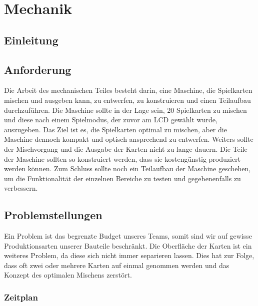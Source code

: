 \chapter{Mechanik}
\section{Einleitung}

\section{Anforderung}
\label{sec:Anforderung}
Die Arbeit des mechanischen Teiles besteht darin, eine Maschine,
die Spielkarten mischen und ausgeben kann, zu entwerfen, zu konstruieren
und einen Teilaufbau durchzuführen. Die Maschine sollte in der Lage
sein, 20 Spielkarten zu mischen und diese nach einem Spielmodus, der
zuvor am LCD gewählt wurde, auszugeben. Das Ziel ist es, die Spielkarten
optimal zu mischen, aber die Maschine dennoch kompakt und optisch
ansprechend zu entwerfen. Weiters sollte der Mischvorgang und die
Ausgabe der Karten nicht zu lange dauern. Die Teile der Maschine
sollten so konstruiert werden, dass sie kostengünstig produziert
werden können. Zum Schluss sollte noch ein Teilaufbau der Maschine
geschehen, um die Funktionalität der einzelnen Bereiche zu testen
und gegebenenfalls zu verbessern.

\section{Problemstellungen}
Ein Problem ist das begrenzte Budget unseres Teams, somit sind
wir auf gewisse Produktionsarten unserer Bauteile beschränkt.
Die Oberfläche der Karten ist ein
weiteres Problem, da diese sich nicht immer separieren lassen. Dies
hat zur Folge, dass oft zwei oder mehrere Karten auf einmal genommen
werden und das Konzept des optimalen Mischens zerstört.

\newpage
\subsection{Zeitplan}

